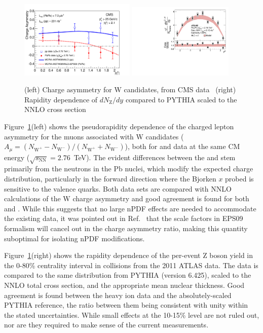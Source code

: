 \begin{figure}[t]
\begin{center}
\includegraphics[width=0.49\textwidth]{electroweak_figs/Fig3.pdf}
\includegraphics[width=0.45\textwidth]{electroweak_figs/fig_02.pdf}
\caption[]{(left) Charge asymmetry for W candidates, from CMS data~\cite{Chatrchyan:2012nt} (right) Rapidity dependence of $dN_{\mathrm{Z}}/dy$ compared to PYTHIA scaled to the NNLO cross section~\cite{Aad:2012ew}}
\label{fig:pas:zw_eta}
\end{center}
\end{figure}
Figure~\ref{fig:pas:zw_eta}(left) shows the pseudorapidity dependence of the charged lepton asymmetry for the muons associated with
W candidates ($A_\mu = (N_{\mathrm{W}^+}-N_{\mathrm{W}^-})/(N_{\mathrm{W}^+}+N_{\mathrm{W}^-})$), both for \PbPb and \pp data at the same CM energy
($\sqrt{s_\mathrm{NN}}=2.76$~TeV).  The evident differences between the \PbPb and \pp stem primarily from the neutrons in the
Pb nuclei, which modify the expected charge distribution, particularly in the forward direction where the Bjorken $x$ probed
is sensitive to the valence quarks.
Both data sets are compared with NNLO calculations of the W charge asymmetry and good agreement is found for both \pp and \PbPb.
While this suggests that no large nPDF effects are needed to accommodate the existing data, it was pointed out in Ref.~\cite{Paukkunen:2010qg}
that the scale factors in EPS09 formalism will cancel out in the charge asymmetry ratio, making this quantity suboptimal for
isolating nPDF modifications.

Figure~\ref{fig:pas:zw_eta}(right) shows the rapidity dependence of the per-event
Z boson yield in the 0-80\% centrality interval in \PbPb collisions
from the 2011 ATLAS \PbPb data.
The data is compared to the same distribution from PYTHIA (version 6.425), scaled to the NNLO total cross section,
and the appropriate mean nuclear thickness.
Good agreement is found between the heavy ion data and the absolutely-scaled PYTHIA reference, the ratio between them being consistent
with unity within the stated uncertainties.  While small effects at the 10-15\% level are not ruled out, nor are they required to
make sense of the current measurements.

